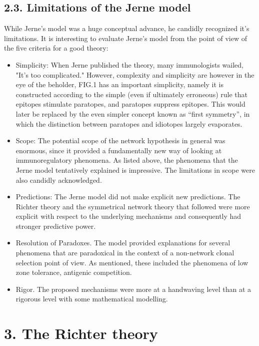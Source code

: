 \documentclass[Proceedings]{ascelike}
\begin{document}
\subsection{2.3. Limitations of the Jerne model}
While Jerne's model was a huge conceptual advance, he candidly recognized it's limitations. It is interesting to evaluate Jerne's model from the point of view of the five criteria for a good theory:
\begin{itemize}
\item
Simplicity: When Jerne published the theory, many immunologists wailed, "It's too complicated." However, complexity and simplicity are however in the eye of the beholder, FIG.1 has an important simplicity, namely it is constructed according to the simple (even if ultimately erroneous) rule that epitopes stimulate paratopes, and paratopes suppress epitopes. This would later be replaced by the even simpler concept known as “first symmetry”, in which the distinction between paratopes and idiotopes largely evaporates.
\item
Scope: The potential scope of the network hypothesis in general was enormous, since it provided a fundamentally new way of looking at immunoregulatory phenomena. As listed above, the phenomena that the Jerne model tentatively explained is impressive. The limitations in scope were also candidly acknowledged. 
\item
Predictions: The Jerne model did not make explicit new predictions. The Richter theory and the symmetrical network theory that followed were more explicit with respect to the underlying mechanisms and consequently had stronger predictive power. 
\item
Resolution of Paradoxes. The model provided explanations for several phenomena that are paradoxical in the context of a non-network clonal selection point of view. As mentioned, these included the phenomena of low zone tolerance, antigenic competition. 
\item
Rigor. The proposed mechanisms were more at a handwaving level than at a rigorous level with some mathematical modelling.
\end{itemize}

\section{3. The Richter theory}
\end{document}
